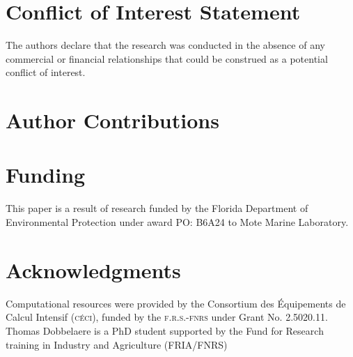 \documentclass[utf8]{frontiersSCNS}
\begin{document}

\section*{Conflict of Interest Statement}
The authors declare that the research was conducted in the absence of any commercial or financial relationships that could be construed as a potential conflict of interest.

\section*{Author Contributions}
  
\section*{Funding}
This paper is a result of research funded by the Florida Department of Environmental Protection under award PO: B6A24 to Mote Marine Laboratory. 

\section*{Acknowledgments}
Computational resources were provided by the Consortium des \'Equipements de Calcul Intensif (\textsc{c\'eci}), funded by the \textsc{f.r.s.-fnrs} under Grant No. 2.5020.11. Thomas Dobbelaere is a PhD student supported by the Fund for Research training in Industry and Agriculture (\textsc{FRIA}/\textsc{FNRS})


 



\end{document}
